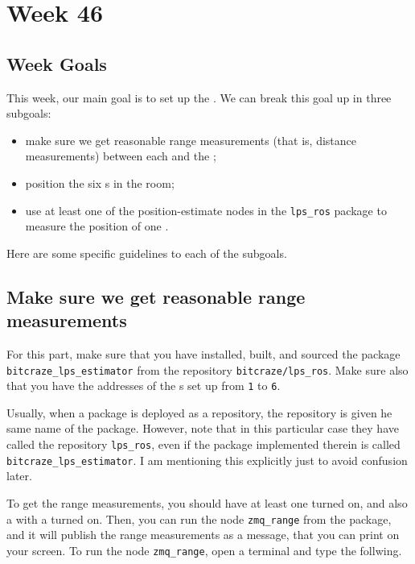 \chapter*{Week 46}





\section*{Week Goals}

This week, our main goal is to set up the \LPS.
We can break this goal up in three subgoals:
\begin{itemize}
  \item make sure we get reasonable range measurements (that is, distance measurements) between each \LPN{} and the \LPD;
  \item position the six \LPN{}s in the room;
  \item use at least one of the position-estimate \ROS nodes in the \verb|lps_ros| package to measure the position of one \CF.
\end{itemize}

Here are some specific guidelines to each of the subgoals.








\section*{Make sure we get reasonable range measurements}

For this part, make sure that you have installed, built, and sourced the \ROS{} package \verb|bitcraze_lps_estimator| from the \Github{} repository \verb|bitcraze/lps_ros|.
Make sure also that you have the addresses of the \LPN{}s set up from \texttt{1} to \texttt{6}.

Usually, when a \ROS{} package is deployed as a \Github{} repository, the repository is given he same name of the package. However, note that in this particular case they have called the repository \verb|lps_ros|, even if the \ROS{} package implemented therein is called \verb|bitcraze_lps_estimator|.
I am mentioning this explicitly just to avoid confusion later.

To get the range measurements, you should have at least one \LPN{} turned on, and also a \CF{} with a \LPD{} turned on.
Then, you can run the node \verb|zmq_range| from the package, and it will publish the range measurements as a \ROS{} message, that you can print on your screen.
To run the node  \verb|zmq_range|, open a terminal and type the follwing.

